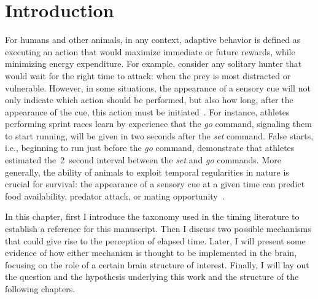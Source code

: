 \chapter{Introduction}
\label{ch:intro:intro}

For humans and other animals, in any context, adaptive behavior is defined as executing an action that would maximize immediate or future rewards, while minimizing energy expenditure.
For example, consider any solitary hunter that would wait for the right time to attack:
    when the prey is most distracted or vulnerable.
However, in some situations, the appearance of a sensory cue will not only indicate which action should be performed, but also how long, after the appearance of the cue, this action must be initiated~\cite{Balsam2009Map, Nobre2018NatRevNeurosci}.
For instance, athletes performing sprint races learn by experience that the \textit{go} command, signaling them to start running, will be given in two seconds after the \textit{set} command.
False starts, i.e., beginning to run just before the \textit{go} command, demonstrate that athletes estimated the~2~second interval between the \textit{set} and \textit{go} commands.
More generally, the ability of animals to exploit temporal regularities in nature is crucial for survival:
    the appearance of a sensory cue at a given time can predict food availability, predator attack, or mating opportunity~\cite{Kacelnik2002,Gallistel1990book}.
\par
In this chapter, first I introduce the taxonomy used in the timing literature to establish a reference for this manuscript.
Then I discuss two possible mechanisms that could give rise to the perception of elapsed time.
Later, I will present some evidence of how either mechanism is thought to be implemented in the brain, focusing on the role of a certain brain structure of interest.
Finally, I will lay out the question and the hypothesis underlying this work and the structure of the following chapters.





